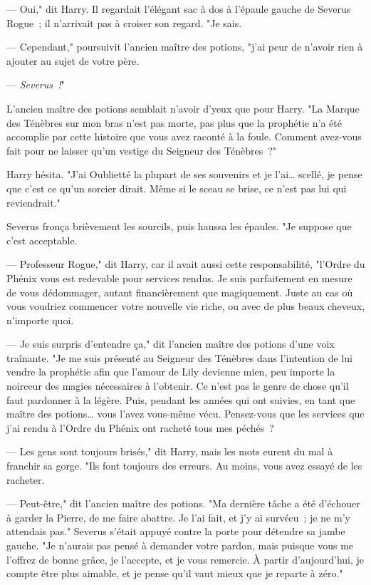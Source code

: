 --- Oui," dit Harry. Il regardait l'élégant sac à dos à l'épaule gauche de Severus Rogue~; il n'arrivait pas à croiser son regard. "Je sais.

--- Cependant," poursuivit l'ancien maître des potions, "j'ai peur de n'avoir rien à ajouter au sujet de votre père.

--- \emph{Severus~!}"

L'ancien maître des potions semblait n'avoir d'yeux que pour Harry. "La Marque des Ténèbres sur mon bras n'est pas morte, pas plus que la prophétie n'a été accomplie par cette histoire que vous avez raconté à la foule. Comment avez-vous fait pour ne laisser qu'un vestige du Seigneur des Ténèbres~?"

Harry hésita. "J'ai Oublietté la plupart de ses souvenirs et je l'ai… scellé, je pense que c'est ce qu'un sorcier dirait. Même si le sceau se brise, ce n'est pas lui qui reviendrait."

Severus fronça brièvement les sourcils, puis haussa les épaules. "Je suppose que c'est acceptable.

--- Professeur Rogue," dit Harry, car il avait aussi cette responsabilité, "l'Ordre du Phénix vous est redevable pour services rendus. Je suis parfaitement en mesure de vous dédommager, autant financièrement que magiquement. Juste au cas où vous voudriez commencer votre nouvelle vie riche, ou avec de plus beaux cheveux, n'importe quoi.

--- Je suis surpris d'entendre ça," dit l'ancien maître des potions d'une voix traînante. "Je me suis présenté au Seigneur des Ténèbres dans l'intention de lui vendre la prophétie afin que l'amour de Lily devienne mien, peu importe la noirceur des magies nécessaires à l'obtenir. Ce n'est pas le genre de chose qu'il faut pardonner à la légère. Puis, pendant les années qui ont suivies, en tant que maître des potions… vous l'avez vous-même vécu. Pensez-vous que les services que j'ai rendu à l'Ordre du Phénix ont racheté tous mes péchés~?

--- Les gens sont toujours brisés," dit Harry, mais les mots eurent du mal à franchir sa gorge. "Ils font toujours des erreurs. Au moins, vous avez essayé de les racheter.

--- Peut-être," dit l'ancien maître des potions. "Ma dernière tâche a été d'échouer à garder la Pierre, de me faire abattre. Je l'ai fait, et j'y ai survécu~; je ne m'y attendais pas." Severus s'était appuyé contre la porte pour détendre sa jambe gauche. "Je n'aurais pas pensé à demander votre pardon, mais puisque vous me l'offrez de bonne grâce, je l'accepte, et je vous remercie. À partir d'aujourd'hui, je compte être plus aimable, et je pense qu'il vaut mieux que je reparte à zéro."

